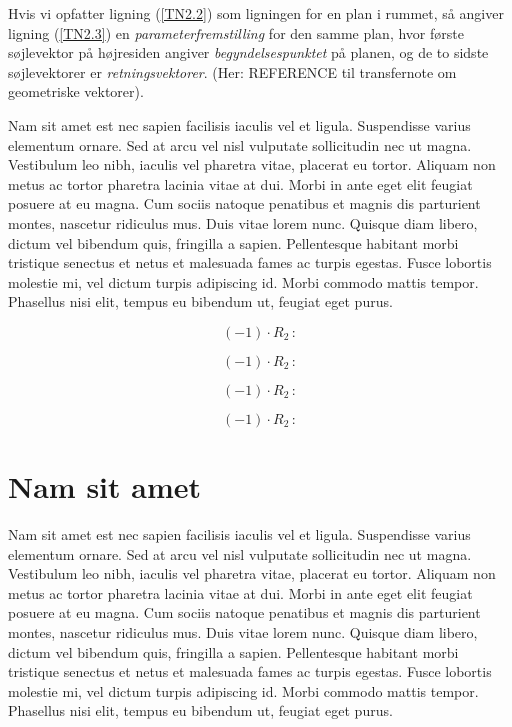 \begin{build}
Hvis vi opfatter ligning (\ref{TN2.2}) som ligningen for en plan i rummet, så angiver ligning (\ref{TN2.3}) en \textit{parameterfremstilling} for den samme plan, hvor første søjlevektor på højresiden angiver \textit{begyndelsespunktet} på planen, og de to sidste søjlevektorer er \textit{retningsvektorer}. (Her: REFERENCE til transfernote om geometriske vektorer).
\end{build}


Nam sit amet est nec sapien facilisis iaculis vel et ligula. Suspendisse varius elementum ornare. Sed at arcu vel nisl vulputate sollicitudin nec ut magna. Vestibulum leo nibh, iaculis vel pharetra vitae, placerat eu tortor. Aliquam non metus ac tortor pharetra lacinia vitae at dui. Morbi in ante eget elit feugiat posuere at eu magna. Cum sociis natoque penatibus et magnis dis parturient montes, nascetur ridiculus mus. Duis vitae lorem nunc. Quisque diam libero, dictum vel bibendum quis, fringilla a sapien. Pellentesque habitant morbi tristique senectus et netus et malesuada fames ac turpis egestas. Fusce lobortis molestie mi, vel dictum turpis adipiscing id. Morbi commodo mattis tempor. Phasellus nisi elit, tempus eu bibendum ut, feugiat eget purus.


\begin{equation}(-1)\cdot R_2\,: \end{equation}


\begin{equation}
(-1)\cdot R_2\,: 
\end{equation}


\begin{equation}(-1)\cdot R_2\,:
 \end{equation}

\begin{equation}
(-1)\cdot R_2\,: \end{equation}





\section{Nam sit amet}
Nam sit amet est nec sapien facilisis iaculis vel et ligula. Suspendisse varius elementum ornare. Sed at arcu vel nisl vulputate sollicitudin nec ut magna. Vestibulum leo nibh, iaculis vel pharetra vitae, placerat eu tortor. Aliquam non metus ac tortor pharetra lacinia vitae at dui. Morbi in ante eget elit feugiat posuere at eu magna. Cum sociis natoque penatibus et magnis dis parturient montes, nascetur ridiculus mus. Duis vitae lorem nunc. Quisque diam libero, dictum vel bibendum quis, fringilla a sapien. Pellentesque habitant morbi tristique senectus et netus et malesuada fames ac turpis egestas. Fusce lobortis molestie mi, vel dictum turpis adipiscing id. Morbi commodo mattis tempor. Phasellus nisi elit, tempus eu bibendum ut, feugiat eget purus.

